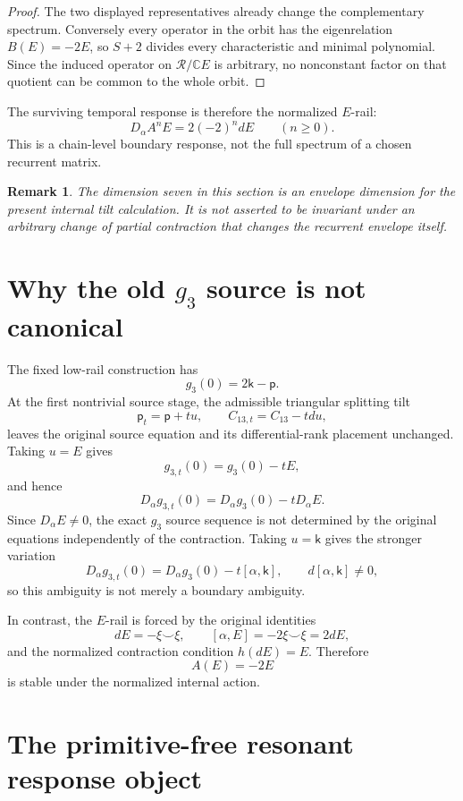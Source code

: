 \documentclass[11pt]{amsart}
\newtheorem{remark}[theorem]{Remark}
\newcommand{\C}{\mathbb C}
\begin{document}
\begin{proof}
The two displayed representatives already change the complementary spectrum.  Conversely every operator in the orbit has the eigenrelation \(B(E)=-2E\), so \(S+2\) divides every characteristic and minimal polynomial.  Since the induced operator on \(\mathcal R/\C E\) is arbitrary, no nonconstant factor on that quotient can be common to the whole orbit.
\end{proof}

The surviving temporal response is therefore the normalized \(E\)-rail:
\[
\boxed{
D_\alpha A^nE=2(-2)^n dE
\qquad(n\geq0).}
\]
This is a chain-level boundary response, not the full spectrum of a chosen recurrent matrix.

\begin{remark}
The dimension seven in this section is an envelope dimension for the present internal tilt calculation.  It is not asserted to be invariant under an arbitrary change of partial contraction that changes the recurrent envelope itself.
\end{remark}

\section{Why the old \(g_3\) source is not canonical}

The fixed low-rail construction has
\[
g_3(0)=2\mathsf k-\mathsf p.
\]
At the first nontrivial source stage, the admissible triangular splitting tilt
\[
\mathsf p_t=\mathsf p+t u,
\qquad
C_{13,t}=C_{13}-tdu,
\]
leaves the original source equation and its differential-rank placement unchanged.  Taking \(u=E\) gives
\[
g_{3,t}(0)=g_3(0)-tE,
\]
and hence
\[
D_\alpha g_{3,t}(0)
=D_\alpha g_3(0)-tD_\alpha E.
\]
Since \(D_\alpha E\neq0\), the exact \(g_3\) source sequence is not determined by the original equations independently of the contraction.  Taking \(u=\mathsf k\) gives the stronger variation
\[
D_\alpha g_{3,t}(0)
=D_\alpha g_3(0)-t[\alpha,\mathsf k],
\qquad
d[\alpha,\mathsf k]\neq0,
\]
so this ambiguity is not merely a boundary ambiguity.

In contrast, the \(E\)-rail is forced by the original identities
\[
dE=-\xi\smile\xi,
\qquad
[\alpha,E]=-2\xi\smile\xi=2dE,
\]
and the normalized contraction condition \(h(dE)=E\).  Therefore
\[
A(E)=-2E
\]
is stable under the normalized internal action.

\section{The primitive-free resonant response object}
\end{document}
